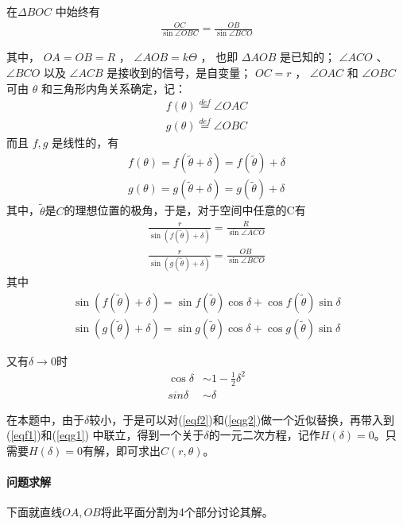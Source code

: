 \documentclass[UTF8]{ctexart}
\begin{document}
在\(\Delta BOC\) 中始终有
\begin{align}
    \frac{OC}{\sin{\angle OBC}} = \frac{OB}{\sin\angle BCO}
\end{align}

其中，
\(OA=OB=R\) ，
\(\angle AOB = k\Theta\) ，
也即 \(\Delta AOB\) 是已知的；
\(\angle ACO\) 、
\(\angle BCO\) 以及
\(\angle ACB\) 是接收到的信号，是自变量；
\(OC=r\) ，
\(\angle OAC\) 和 \(\angle OBC\)
可由 \(\theta\) 和三角形内角关系确定，记：
\begin{align}
    f(\theta)\overset{def}{=}\angle OAC \\
    g(\theta)\overset{def}{=}\angle OBC
\end{align}
而且 \(f,g\) 是线性的，有
\begin{align*}
    f(\theta) = f(\tilde{\theta}+\delta)=f(\tilde{\theta})+\delta \\
    g(\theta) = g(\tilde{\theta}+\delta) = g(\tilde{\theta})+\delta
\end{align*}
其中，\(\tilde{\theta}\)是\(C\)的理想位置的极角，于是，对于空间中任意的C有
\begin{align}
    \frac{r}{\sin(f(\tilde{\theta})+\delta)} = \frac{R}{\sin\angle ACO} \label{eqf1} \\
    \frac{r}{\sin(g(\tilde{\theta})+\delta)} = \frac{OB}{\sin\angle BCO} \label{eqg1}
\end{align}
其中
\begin{align}
    \sin(f(\tilde{\theta})+\delta)=\sin f(\tilde{\theta}) \cos\delta+\cos f(\tilde{\theta})\sin\delta \label{eqf2} \\
    \sin(g(\tilde{\theta})+\delta)=\sin g(\tilde{\theta}) \cos\delta+\cos g(\tilde{\theta})\sin\delta \label{eqg2}
\end{align}

又有\(\delta\rightarrow 0 \)时
\begin{align*}
    \cos\delta & \sim 1-\frac{1}{2}\delta^2 \\
    sin\delta  & \sim \delta
\end{align*}

在本题中，由于\(\delta\)较小，于是可以对(\ref{eqf2})和(\ref{eqg2})做一个近似替换，再带入到(\ref{eqf1})和(\ref{eqg1}) 中联立，得到一个关于\(\delta\)的一元二次方程，记作\(H(\delta)= 0 \)。只需要\(H(\delta)=0\)有解，即可求出\(C(r,\theta)\)。

\paragraph{问题求解}下面就直线$ OA,OB $将此平面分割为4个部分讨论其解。
\end{document}
